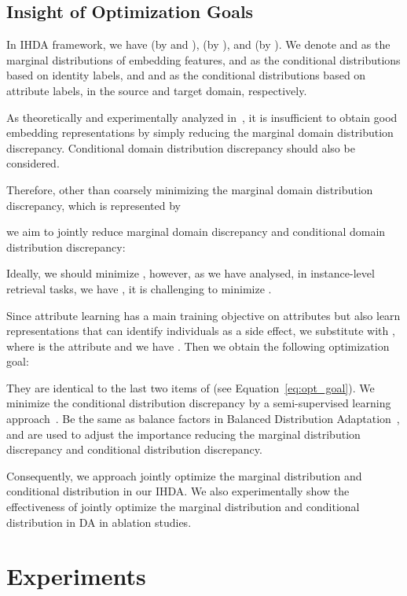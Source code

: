 \documentclass[journal]{IEEEtran}
\begin{document}
\subsection{Insight of Optimization Goals}

In IHDA framework, we have  (by  and ),  (by ), and  (by ). We denote  and  as the marginal distributions of embedding features,  and  as the conditional distributions based on identity labels, and  and  as the conditional distributions based on attribute labels, in the source and target domain, respectively.

As theoretically and experimentally analyzed in~\cite{long2013transfer,saito2017asymmetric, long2017deep,zhang2017joint,wang2017balanced,zhao2019learning}, it is insufficient to obtain good embedding representations  by simply reducing the marginal domain distribution discrepancy. Conditional domain distribution discrepancy should also be considered. 

Therefore, other than coarsely minimizing the marginal domain distribution discrepancy, which is represented by

we aim to jointly reduce marginal domain discrepancy and conditional domain distribution discrepancy: 


Ideally, we should minimize , however, as we have analysed, in instance-level retrieval tasks, we have , it is challenging to minimize . 

Since attribute learning has a main training objective on attributes but also learn representations that can identify individuals as a side effect, we substitute  with , where  is the attribute and we have . Then we obtain the following optimization goal:


They are identical to the last two items of  (see Equation~\ref{eq:opt_goal}).
We minimize the conditional distribution discrepancy  by a semi-supervised learning approach~\cite{grandvalet2005semi,saito2019semi}. Be the same as balance factors in Balanced Distribution Adaptation~\cite{wang2017balanced},  and  are used to adjust the importance reducing the marginal distribution discrepancy and conditional distribution discrepancy.

Consequently, we approach jointly optimize the marginal distribution and conditional distribution in our IHDA. 
We also experimentally show the effectiveness of jointly optimize the marginal distribution and conditional distribution in DA in ablation studies. 


\section{Experiments}
\label{sec:experiments}
\end{document}
